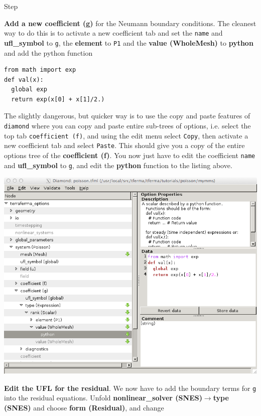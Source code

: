 \begin{steps}{Step}
\begin{center}
  \end{center}
\item \textbf{Add a new coefficient (g)} for the Neumann boundary conditions.  The cleanest way to do this is to activate a new coefficient tab and set the \texttt{name} and \textbf{ufl\_symbol} to \texttt{g},  the \textbf{element} to \texttt{P1} and the \textbf{value (WholeMesh)} to \textbf{python} and add the python function
\begin{lstlisting}[style=python]
from math import exp
def val(x):
  global exp
  return exp(x[0] + x[1]/2.)    
\end{lstlisting}

The slightly dangerous, but quicker way is to use the copy and paste features of \texttt{diamond} where you can copy and paste entire sub-trees of options, i.e. select the top tab \texttt{coefficient (f)}, and using the edit menu select \texttt{Copy}, then activate a new coefficient tab and select \texttt{Paste}.  This should give you a copy of the entire options tree of the \textbf{coefficient (f)}.  You now just have to edit the coefficient \texttt{name} and \textbf{ufl\_symbol} to \texttt{g}, and edit the \textbf{python} function to the listing above. 
 \begin{center}
\includegraphics[width=\diamondwidth]{figures/screendumps/diamond_poisson_mms_g_value.png}
  \end{center} 
\item \textbf{Edit the UFL for the residual}. We now have to add the boundary terms for \texttt{g} into the residual equations.  Unfold \textbf{nonlinear\_solver (SNES)}$\rightarrow$\textbf{type (SNES)} and choose \textbf{form (Residual)}, and change

\end{steps}
